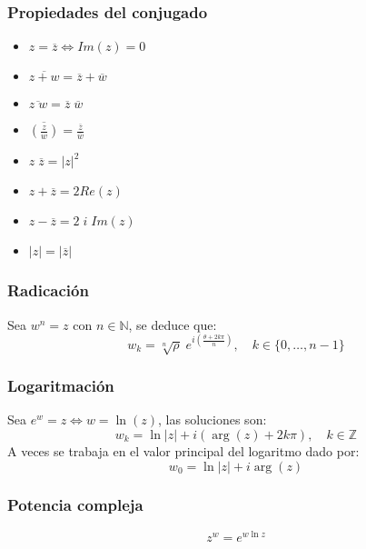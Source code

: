 \subsubsection*{Propiedades del conjugado}
\begin{itemize}
    \item \(z = \overline{z} \iff Im(z) = 0\)
    \item \(\overline{z+w} = \overline{z} + \overline{w}\)
    \item \(\overline{z \; w} = \overline{z} \; \overline{w}\)
    \item \(\overline{\left(\frac{z}{w} \right)} = \frac{\overline{z}}{\overline{w}}\)
    \item \(z \; \overline{z} = |z|^2\)
    \item \( z + \overline{z} = 2 Re(z) \)
    \item \(z - \overline{z} = 2 \; i \; Im(z)\)
    \item \(|z| = |\overline{z}|\)
\end{itemize}
\subsubsection*{Radicación}
Sea \(w^n = z\) con \(n \in \mathbb{N}\), se deduce que:
\[w_k = \sqrt[n]{\rho} \; e^{i \left(\frac{\theta + 2k \pi}{n}\right)}, \quad k \in \{0, \dots, n-1\}\]
\subsubsection*{Logaritmación}
Sea \(e^w = z \iff w = \ln (z)\), las soluciones son:
\[w_k = \ln|z| + i (\arg(z) + 2k\pi), \quad k \in \mathbb{Z}\]
A veces se trabaja en el valor principal del logaritmo dado por:
\[w_0 = \ln|z| + i \arg(z)\]
\subsubsection*{Potencia compleja}
\[z^w = e^{w \ln z}\]